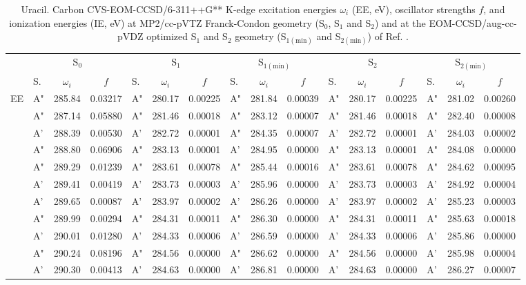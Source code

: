 \documentclass[journal=jctcce,manuscript=article]{achemso}
\begin{document}
\begin{table}
\caption{Uracil.  Carbon CVS-EOM-CCSD/6-311++G** K-edge excitation energies $\omega_i$ (EE, eV), oscillator strengths $f$, and ionization energies (IE, eV) at MP2/cc-pVTZ Franck-Condon geometry (S$_0$, S$_1$ and S$_2$) and at the EOM-CCSD/aug-cc-pVDZ optimized S$_1$ and S$_2$ geometry (S$_{1(\text{min})}$ and S$_{2(\text{min})}$) of Ref. .
\label{Tab:Uracil:CCSD:Carbon}}
\scriptsize
\begin{tabular}{l|lcc|lcc|lcc|lcc|lcc}
\cline{2-16}
& \multicolumn{3}{c|}{S$_0$}
& \multicolumn{3}{c|}{S$_1$}  
& \multicolumn{3}{c|}{S$_{1(\text{min})}$}
& \multicolumn{3}{c|}{S$_2$}
& \multicolumn{3}{c}{S$_{2(\text{min})}$}
\\
\cline{2-16}
& S. & $\omega_i$ & $f$ 
& S. & $\omega_i$ & $f$ 
& S. & $\omega_i$ & $f$ 
& S. & $\omega_i$ & $f$ 
& S. & $\omega_i$ & $f$\\
\hline
  EE 
& A" & 285.84 & 0.03217 & A" & 280.17 & 0.00225 & A" & 281.84 & 0.00039 & A" & 280.17 & 0.00225 & A" & 281.02 & 0.00260 \\
& A" & 287.14 & 0.05880 & A" & 281.46 & 0.00018 & A" & 283.12 & 0.00007 & A" & 281.46 & 0.00018 & A" & 282.40 & 0.00008 \\
& A' & 288.39 & 0.00530 & A' & 282.72 & 0.00001 & A" & 284.35 & 0.00007 & A' & 282.72 & 0.00001 & A' & 284.03 & 0.00002 \\
& A" & 288.80 & 0.06906 & A" & 283.13 & 0.00001 & A' & 284.95 & 0.00000 & A" & 283.13 & 0.00001 & A" & 284.08 & 0.00000 \\
& A" & 289.29 & 0.01239 & A" & 283.61 & 0.00078 & A" & 285.44 & 0.00016 & A" & 283.61 & 0.00078 & A" & 284.62 & 0.00095 \\
& A' & 289.41 & 0.00419 & A' & 283.73 & 0.00003 & A' & 285.96 & 0.00000 & A' & 283.73 & 0.00003 & A' & 284.92 & 0.00004 \\
& A' & 289.65 & 0.00087 & A' & 283.97 & 0.00002 & A' & 286.26 & 0.00000 & A' & 283.97 & 0.00002 & A' & 285.23 & 0.00003 \\
& A" & 289.99 & 0.00294 & A" & 284.31 & 0.00011 & A" & 286.30 & 0.00000 & A" & 284.31 & 0.00011 & A" & 285.63 & 0.00018 \\
& A' & 290.01 & 0.01280 & A' & 284.33 & 0.00006 & A' & 286.59 & 0.00000 & A' & 284.33 & 0.00006 & A' & 285.86 & 0.00000 \\
& A" & 290.24 & 0.08196 & A" & 284.56 & 0.00000 & A" & 286.62 & 0.00000 & A" & 284.56 & 0.00000 & A' & 285.98 & 0.00004 \\
& A' & 290.30 & 0.00413 & A' & 284.63 & 0.00000 & A' & 286.81 & 0.00000 & A' & 284.63 & 0.00000 & A' & 286.27 & 0.00007 \\

\end{tabular}
\end{table}
\end{document}
